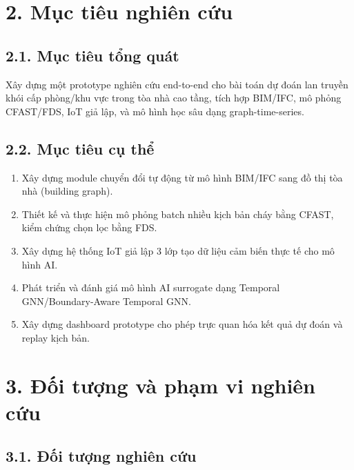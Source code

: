 \section*{2. Mục tiêu nghiên cứu}

\subsection*{2.1. Mục tiêu tổng quát}

Xây dựng một prototype nghiên cứu end-to-end cho bài toán dự đoán lan truyền khói cấp phòng/khu vực trong tòa nhà cao tầng, tích hợp BIM/IFC, mô phỏng CFAST/FDS, IoT giả lập, và mô hình học sâu dạng graph-time-series.

\subsection*{2.2. Mục tiêu cụ thể}

\begin{enumerate}
  \item Xây dựng module chuyển đổi tự động từ mô hình BIM/IFC sang đồ thị tòa nhà (building graph).
  \item Thiết kế và thực hiện mô phỏng batch nhiều kịch bản cháy bằng CFAST, kiểm chứng chọn lọc bằng FDS.
  \item Xây dựng hệ thống IoT giả lập 3 lớp tạo dữ liệu cảm biến thực tế cho mô hình AI.
  \item Phát triển và đánh giá mô hình AI surrogate dạng Temporal GNN/Boundary-Aware Temporal GNN.
  \item Xây dựng dashboard prototype cho phép trực quan hóa kết quả dự đoán và replay kịch bản.
\end{enumerate}

\section*{3. Đối tượng và phạm vi nghiên cứu}

\subsection*{3.1. Đối tượng nghiên cứu}

